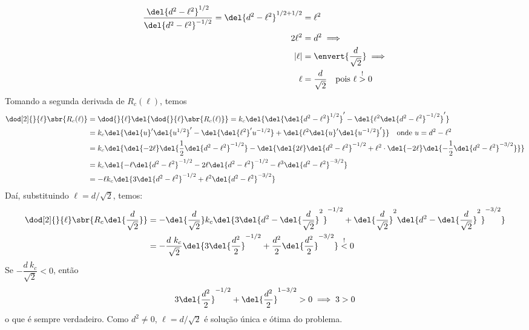 \documentclass[]{IMTexam}
\begin{document}
\begin{questions}
\begin{parts}
\begin{solution}
\begin{align*}
				\dfrac{\del{d^{2}-\ell^{2}}^{1/2}}{\del{d^{2}-\ell^{2}}^{-1/2}}=\del{d^{2}-\ell^{2}}^{1/2+1/2} & = \ell^{2}                                                \\
				2\ell^{2}                                                                                      & = d^{2}\implies                                           \\
				|\ell|                                                                                         & =\envert{\dfrac{d}{\sqrt{2}}}\implies                     \\
				\ell                                                                                           & =\dfrac{d}{\sqrt{2}}\quad\text{pois }\ell\stackrel{!}{>}0
			\end{align*}
			Tomando a segunda derivada de $ R_c(\ell) $, temos
			\begin{align}
				\dod[2]{}{\ell}\sbr{R_c(\ell)} & =\dod{}{\ell}\del{\dod{}{\ell}\sbr{R_c(\ell)}}=k_c\del{\del{\del{d^{2}-\ell^{2}}^{1/2}}' - \del{\ell^{2}\del{d^{2}-\ell^{2}}^{-1/2}}'}\nonumber  \\
				                               & =k_c\del{\del{u}'\del{u^{1/2}}' - \del{\del{\ell^{2}}'u^{-1/2}}+\del{\ell^{2}\del{u}'\del{u^{-1/2}}'}}\quad\text{onde }u=d^{2}-\ell^{2}\nonumber \\
				                               & =k_c\del{\del{-2\ell}\del{\dfrac{1}{2}\del{d^{2}-\ell^{2}}^{-1/2}} -
				\del{\del{2\ell}\del{d^{2}-\ell^{2}}^{-1/2}+\ell^{2}\cdot \del{-2\ell}\del{-\dfrac{1}{2}\del{d^{2}-\ell^{2}}^{-3/2}}}}                                        \nonumber           \\
				                               & =k_c\del{-\ell\del{d^{2}-\ell^{2}}^{-1/2} -
				2\ell\del{d^{2}-\ell^{2}}^{-1/2} -\ell^{3}\del{d^{2}-\ell^{2}}^{-3/2}}                                                \nonumber                                                   \\
				                               & =-\ell k_c\del{3\del{d^{2}-\ell^{2}}^{-1/2}+\ell^{2}\del{d^{2}-\ell^{2}}^{-3/2}}\label{eq:q2Rcddot}
			\end{align}
			Daí, substituindo $ \ell=d/\sqrt{2} $, temos:
			\begin{align*}
				\dod[2]{}{\ell}\sbr{R_c\del{\dfrac{d}{\sqrt{2}}}} & =
				-\del{\dfrac{d}{\sqrt{2}}} k_c\del{3\del{d^{2}-\del{\dfrac{d}{\sqrt{2}}}^{2}}^{-1/2}+\del{\dfrac{d}{\sqrt{2}}}^{2}\del{d^{2}-\del{\dfrac{d}{\sqrt{2}}}^{2}}^{-3/2}}              \\
				                                                  & =-\dfrac{d\ k_c}{\sqrt{2}} \del{3\del{\dfrac{d^{2}}{2}}^{-1/2}+\dfrac{d^{2}}{2}\del{\dfrac{d^{2}}{2}}^{-3/2}}\overset{!}{<}0
			\end{align*}
			Se $ -\dfrac{d\ k_c}{\sqrt{2}}<0 $, então
			\[ 3\del{\dfrac{d^{2}}{2}}^{-1/2}+\del{\dfrac{d^{2}}{2}}^{1-3/2}>0 \implies 3>0 \]
			o que é sempre verdadeiro. Como $ d^{2}\neq0 $, $ \ell=d/\sqrt{2} $ é solução única e ótima do problema.
		\end{solution}


\end{parts}
\end{questions}
\end{document}
